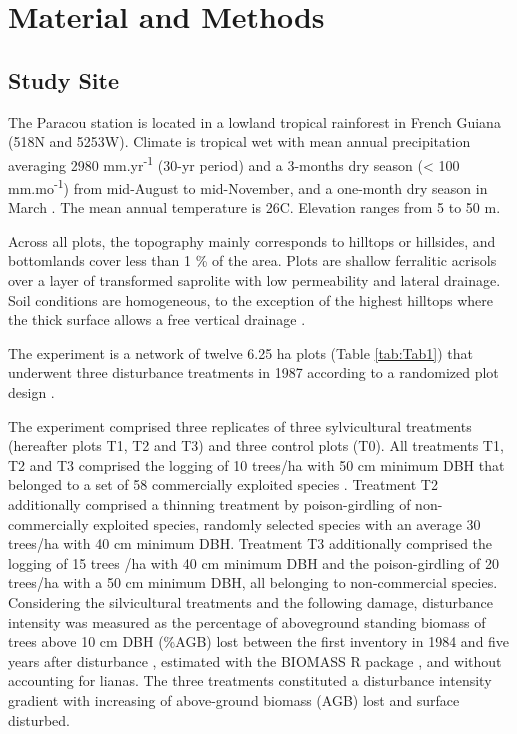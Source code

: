 \documentclass[fleqn,10pt]{ArtEcoFoG} %
\begin{document}
\color{black}

\section{Material and Methods}\label{material-and-methods}

\subsection{Study Site}\label{study-site}

The Paracou station is located in a lowland tropical rainforest in
French Guiana (518\textdegree N and 5253\textdegree W). Climate is
tropical wet with mean annual precipitation averaging 2980
mm.yr\textsuperscript{-1} (30-yr period) and a 3-months dry season
(\textless{} 100 mm.mo\textsuperscript{-1}) from mid-August to
mid-November, and a one-month dry season in March \citep{Wagner2011}.
The mean annual temperature is 26\textdegree C. Elevation ranges from 5
to 50 m.

\color{red} Across all plots, the topography mainly corresponds to
hilltops or hillsides, and bottomlands cover less than 1 \% of the area.
Plots are shallow ferralitic acrisols over a layer of transformed
saprolite with low permeability and lateral drainage. Soil conditions
are homogeneous, to the exception of the highest hilltops where the
thick surface allows a free vertical drainage
\citep{Gourlet-Fleury2004}. \color{black}

The experiment is a network of twelve 6.25 ha plots (Table
\ref{tab:Tab1}) that underwent three disturbance treatments in 1987
according to a randomized plot design \citep{Herault2018}.

\color{red} The experiment comprised three replicates of three
sylvicultural treatments (hereafter plots T1, T2 and T3) and three
control plots (T0). All treatments T1, T2 and T3 comprised the logging
of 10 trees/ha with 50 cm minimum DBH that belonged to a set of 58
commercially exploited species \citep{Gourlet-Fleury2004}. Treatment T2
additionally comprised a thinning treatment by poison-girdling of
non-commercially exploited species, randomly selected species with an
average 30 trees/ha with 40 cm minimum DBH. Treatment T3 additionally
comprised the logging of 15 trees /ha with 40 cm minimum DBH and the
poison-girdling of 20 trees/ha with a 50 cm minimum DBH, all belonging
to non-commercial species. Considering the silvicultural treatments and
the following damage, disturbance intensity was measured as the
percentage of aboveground standing biomass of trees above 10 cm DBH
(\%AGB) lost between the first inventory in 1984 and five years after
disturbance \citep{Piponiot2016}, estimated with the BIOMASS R package
\citep{Biomass2018}, and without accounting for lianas. The three
treatments constituted a disturbance intensity gradient with increasing
of above-ground biomass (AGB) lost and surface disturbed. \color{black}
\end{document}
